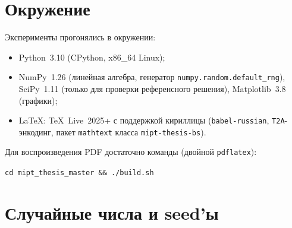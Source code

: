 \section{Окружение}

Эксперименты прогонялись в окружении:
\begin{itemize}\itemsep0pt
  \item Python~3.10 (CPython, x86\_64 Linux);
  \item NumPy~1.26 (линейная алгебра, генератор
        \texttt{numpy.random.default\_rng}),
        SciPy~1.11 (только для проверки референсного решения),
        Matplotlib~3.8 (графики);
  \item \LaTeX: TeX~Live~2025+ с поддержкой кириллицы (\texttt{babel-russian},
        \texttt{T2A}-энкодинг, пакет \texttt{mathtext} класса
        \texttt{mipt-thesis-bs}).
\end{itemize}
Для воспроизведения PDF достаточно команды (двойной \texttt{pdflatex}):
\begin{center}
\verb|cd mipt_thesis_master && ./build.sh|
\end{center}

\section{Случайные числа и seed'ы}

